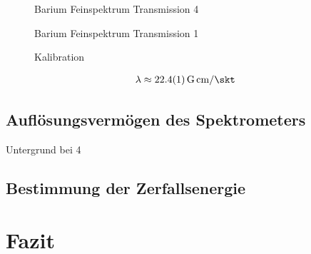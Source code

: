 \documentclass[11pt, a4paper]{article}
\numberwithin{equation}{section}
\begin{document}
\begin{figure}[h]
	\centering
	
	\caption{Barium Feinspektrum Transmission 4}
	\label{fig:ba_t4_fein}
\end{figure}

\begin{figure}[h]
	\centering
	
	\caption{Barium Feinspektrum Transmission 1}
	\label{fig:ba_t1_fein}
\end{figure}

\begin{figure}[h]
	\centering
	
	\caption{Kalibration}
	\label{fig:kalibration}
\end{figure}
\begin{align}
	\lambda \approx \SI{22.4 +- 0.1}{G.cm\per\skt}
\end{align}

\subsection{Auflösungsvermögen des Spektrometers}

\begin{table}[h]
	\centering
	
	\caption{Untergrund  bei 4}
	\label{tab:untergrund_ba4}
\end{table}
\subsection{Bestimmung der Zerfallsenergie}


\section{Fazit}
\end{document}
